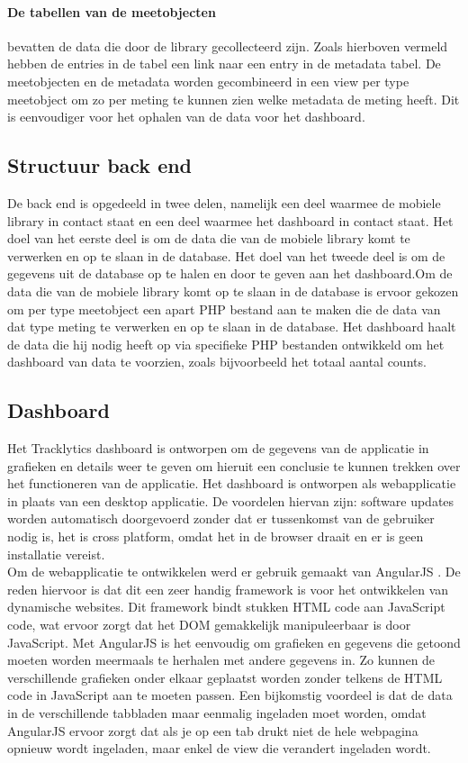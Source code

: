 \paragraph{De tabellen van de meetobjecten} bevatten de data die door de library gecollecteerd zijn. Zoals hierboven vermeld hebben de entries in de tabel een link naar een entry in de metadata tabel. De meetobjecten en de metadata worden gecombineerd in een view per type meetobject om zo per meting te kunnen zien welke metadata de meting heeft. Dit is eenvoudiger voor het ophalen van de data voor het dashboard.

\subsection{Structuur back end}
De back end is opgedeeld in twee delen, namelijk een deel waarmee de mobiele library in contact staat en een deel waarmee het dashboard in contact staat. Het doel van het eerste deel is om de data die van de mobiele library komt te verwerken en op te slaan in de database. Het doel van het tweede deel is om de gegevens uit de database op te halen en door te geven aan het dashboard.Om de data die van de mobiele library komt op te slaan in de database is ervoor gekozen om per type meetobject een apart PHP bestand aan te maken die de data van dat type meting te verwerken en op te slaan in de database. Het dashboard haalt de data die hij nodig heeft op via specifieke PHP bestanden ontwikkeld om het dashboard van data te voorzien, zoals bijvoorbeeld het totaal aantal counts. 




\subsection{Dashboard}\label{visualisatie}
Het Tracklytics dashboard is ontworpen om de gegevens van de applicatie in grafieken en details weer te geven om hieruit een conclusie te kunnen trekken over het functioneren van de applicatie. Het dashboard is ontworpen als webapplicatie in plaats van een desktop applicatie. De voordelen hiervan zijn: software updates worden automatisch doorgevoerd zonder dat er tussenkomst van de gebruiker nodig is, het is cross platform, omdat het in de browser draait en er is geen installatie vereist. \\

Om de webapplicatie te ontwikkelen werd er gebruik gemaakt van AngularJS \cite{AngularJS}. De reden hiervoor is dat dit een zeer handig framework is voor het ontwikkelen van dynamische websites. Dit framework bindt stukken HTML code aan JavaScript code, wat ervoor zorgt dat het DOM gemakkelijk manipuleerbaar is door JavaScript.
Met AngularJS is het eenvoudig om grafieken en gegevens die getoond moeten worden meermaals te herhalen met andere gegevens in. Zo kunnen de verschillende grafieken onder elkaar geplaatst worden zonder telkens de HTML code in JavaScript aan te moeten passen. Een bijkomstig voordeel is dat de data in de verschillende tabbladen maar eenmalig ingeladen moet worden, omdat AngularJS ervoor zorgt dat als je op een tab drukt niet de hele webpagina opnieuw wordt ingeladen, maar enkel de view die verandert ingeladen wordt.

